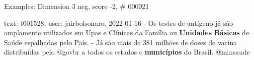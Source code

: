 \begin{frame}{Examples: Dimension 3 neg, score -2, \# 000021}
\footnotesize
\begin{alertblock}{text: t001528, user: jairbolsonaro, 2022-01-16}
- Os testes de antígeno já são amplamente utilizados em Upas e Clínicas da 
Família ou \textbf{Unidades} \textbf{Básicas} de Saúde espalhadas pelo País. - 
Já são mais de 381 milhões de doses de vacina distribuídas pelo @govbr a todos 
os estados e \textbf{municípios} do Brasil. @minsaude 
\end{alertblock}
\end{frame}
